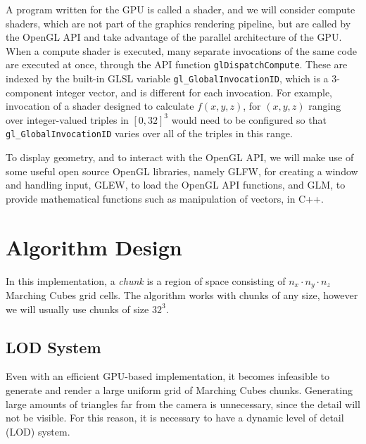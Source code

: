 \documentclass[11pt]{article}
\begin{document}
A program written for the GPU is called a shader, and we will consider compute shaders, which are not part of the graphics rendering pipeline, but are called by the OpenGL API and take advantage of the parallel architecture of the GPU. When a compute shader is executed, many separate invocations of the same code are executed at once, through the API function \texttt{glDispatchCompute}. These are indexed by the built-in GLSL variable \texttt{gl\_GlobalInvocationID}, which is a 3-component integer vector, and is different for each invocation. For example, invocation of a shader designed to calculate $f\left(x,y,z\right)$, for $ \left(x,y,z\right)$ ranging over integer-valued triples in $\left[0,32\right]^3$ would need to be configured so that \texttt{gl\_GlobalInvocationID} varies over all of the triples in this range.

To display geometry, and to interact with the OpenGL API, we will make use of some useful open source OpenGL libraries, namely GLFW\cite{glfw}, for creating a window and handling input, GLEW\cite{glew}, to load the OpenGL API functions, and GLM\cite{g-truc_2005}, to provide mathematical functions such as manipulation of vectors, in C++.


\section{Algorithm Design}
In this implementation, a \textit{chunk} is a region of space consisting of $n_x \cdot n_y \cdot n_z$ Marching Cubes grid cells. The algorithm works with chunks of any size, however we will usually use chunks of size $32^3$. 

\subsection{LOD System}
Even with an efficient GPU-based implementation, it becomes infeasible to generate and render a large uniform grid of Marching Cubes chunks. Generating large amounts of triangles far from the camera is unnecessary, since the detail will not be visible. For this reason, it is necessary to have a dynamic level of detail (LOD) system.
\end{document}
